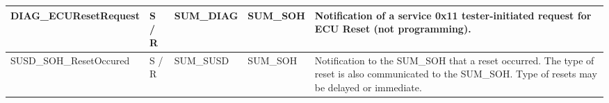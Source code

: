 \begin{longtable}{|l|l|l|l|l|}
\begin{minipage}{0.39\linewidth}\raggedright\vspace{.75ex}DIAG\_ECUResetRequest\vspace{.75ex}\end{minipage} & \begin{minipage}{0.07\linewidth}\raggedright\vspace{.75ex}S / R\vspace{.75ex}\end{minipage} & \begin{minipage}{0.11\linewidth}\raggedright\vspace{.75ex}SUM\_DIAG\vspace{.75ex}\end{minipage} & \begin{minipage}{0.11\linewidth}\raggedright\vspace{.75ex}SUM\_SOH\vspace{.75ex}\end{minipage} & \begin{minipage}{0.16\linewidth}\raggedright\vspace{.75ex}Notification of a service 0x11 tester-initiated request for ECU Reset (not programming).\vspace{.75ex}\end{minipage}\\\hline
\begin{minipage}{0.39\linewidth}\raggedright\vspace{.75ex}SUSD\_SOH\_ResetOccured\vspace{.75ex}\end{minipage} & \begin{minipage}{0.07\linewidth}\raggedright\vspace{.75ex}S / R\vspace{.75ex}\end{minipage} & \begin{minipage}{0.11\linewidth}\raggedright\vspace{.75ex}SUM\_SUSD\vspace{.75ex}\end{minipage} & \begin{minipage}{0.11\linewidth}\raggedright\vspace{.75ex}SUM\_SOH\vspace{.75ex}\end{minipage} & \begin{minipage}{0.16\linewidth}\raggedright\vspace{.75ex}Notification to the SUM\_SOH that a reset occurred. The type of reset is also communicated to the SUM\_SOH. Type of resets may be delayed or immediate.\vspace{.75ex}\end{minipage}\\\hline

\end{longtable}
